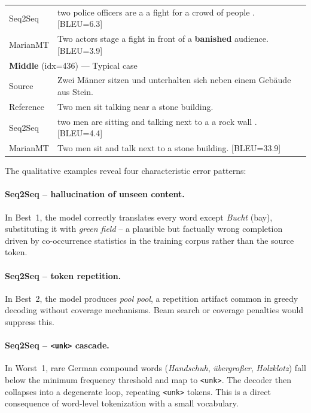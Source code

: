 \documentclass[11pt,a4paper]{article}
\begin{document}
\begin{table}[H]
\begin{tabular}{p{} p{}}
Seq2Seq   & two police officers are a a fight for a crowd of people . \hfill [BLEU=6.3] \\
MarianMT  & Two actors stage a fight in front of a \textbf{banished} audience. \hfill [BLEU=3.9] \\
\midrule
\multicolumn{2}{l}{\textbf{Middle} (idx=436) — Typical case} \\
\midrule
Source    & Zwei Männer sitzen und unterhalten sich neben einem Gebäude aus Stein. \\
Reference & Two men sit talking near a stone building. \\
Seq2Seq   & two men are sitting and talking next to a a rock wall . \hfill [BLEU=4.4] \\
MarianMT  & Two men sit and talk next to a stone building. \hfill [BLEU=33.9] \\
\bottomrule
\end{tabular}
\end{table}

The qualitative examples reveal four characteristic error patterns:

\paragraph{Seq2Seq -- hallucination of unseen content.}
In Best~1, the model correctly translates every word except \emph{Bucht}
(bay), substituting it with \emph{green field} -- a plausible but factually
wrong completion driven by co-occurrence statistics in the training corpus
rather than the source token.

\paragraph{Seq2Seq -- token repetition.}
In Best~2, the model produces \emph{pool pool}, a repetition artifact common
in greedy decoding without coverage mechanisms. Beam search or coverage
penalties would suppress this.

\paragraph{Seq2Seq -- \texttt{<unk>} cascade.}
In Worst~1, rare German compound words (\emph{Handschuh}, \emph{übergroßer},
\emph{Holzklotz}) fall below the minimum frequency threshold and map to
\texttt{<unk>}. The decoder then collapses into a degenerate loop, repeating
\texttt{<unk>} tokens. This is a direct consequence of word-level
tokenization with a small vocabulary.
\end{document}
